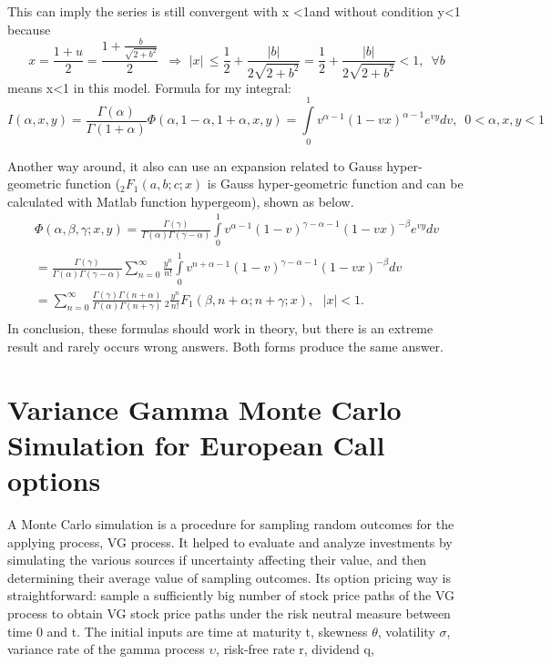 This can imply the series is still convergent with \textbar x\textbar 
\textless 1and without condition \textbar y\textbar \textless 1 because 
\[
x=\frac{1+u}{2}=\frac{1+\frac{b}{\sqrt {2+b^{2}} }}{2}\,\,\,\Rightarrow 
\,\,\vert x\vert \,\le \frac{1}{2}+\frac{\vert b\vert }{2\sqrt {2+b^{2}} 
}=\frac{1}{2}+\frac{\vert b\vert }{2\sqrt {2+b^{2}} }<1,\,\,\,\forall b
\]
means \textbar x\textbar \textless 1 in this model. Formula for my integral:
\[
I(\alpha ,x,y)=\frac{\Gamma (\alpha )}{\Gamma (1+\alpha )}\Phi (\alpha 
,1-\alpha ,1+\alpha ,x,y)=\int\limits_0^1 {v^{\alpha -1}(1-vx)^{\alpha 
-1}e^{vy}dv,\,\,\,0<\alpha ,x,y<1} 
\]

Another way around, it also can use an expansion related to Gauss 
hyper-geometric function ($_{2} F_{1} (a,b;c;x)$ is Gauss hyper-geometric 
function and can be calculated with Matlab function hypergeom), shown as 
below. 
\[
\begin{array}{l}
 \Phi (\alpha ,\beta ,\gamma ;x,y)=\frac{\Gamma (\gamma )}{\Gamma (\alpha 
)\Gamma (\gamma -\alpha )}\int\limits_0^1 {v^{\alpha -1}(1-v)^{\gamma 
-\alpha -1}(1-vx)^{-\beta }e^{vy}dv} \\ 
 =\frac{\Gamma (\gamma )}{\Gamma (\alpha )\Gamma (\gamma -\alpha 
)}\sum\limits_{n=0}^\infty {\frac{y^{n}}{n!}\int\limits_0^1 {v^{n+\alpha 
-1}(1-v)^{\gamma -\alpha -1}(1-vx)^{-\beta }dv} } \\ 
 =\sum\limits_{n=0}^\infty {\frac{\Gamma (\gamma )\Gamma (n+\alpha )}{\Gamma 
(\alpha )\Gamma (n+\gamma )}} \,_{2} \frac{y^{n}}{n!}F_{1} (\beta ,n+\alpha 
;n+\gamma ;x),\,\,\,\,\vert x\vert <1. \\ 
 \end{array}
\]
In conclusion, these formulas should work in theory, but there is an extreme 
result and rarely occurs wrong answers. Both forms produce the same answer.

\section[Monte Carlo Simulation for European Call options]
        {Variance Gamma Monte Carlo Simulation for European Call options}

A Monte Carlo simulation is a procedure for sampling random outcomes for the 
applying process, VG process. It helped to evaluate and analyze investments 
by simulating the various sources if uncertainty affecting their value, and 
then determining their average value of sampling outcomes. Its option 
pricing way is straightforward: sample a sufficiently big number of stock 
price paths of the VG process to obtain VG stock price paths under the risk 
neutral measure between time 0 and t. The initial inputs are time at 
maturity t, skewness $\theta $, volatility $\sigma $, variance rate of the 
gamma process $\upsilon $, risk-free rate r, dividend q, 

